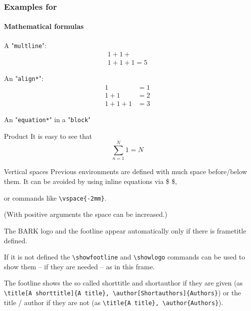 \documentclass{beamer}
\begin{document}
	\begin{frame}
		\frametitle{Examples for}
		\framesubtitle{Mathematical formulas}
		
		A "\texttt{multline}":
		\begin{multline}
		1 + 1+ \\ 1+ 1 + 1 = 5
		\end{multline}
		
		An "\texttt{align*}":
		\begin{align*}
		 1 &= 1 \\
		 1+1&=2 \\
		 1+1+1 &= 3
		\end{align*}
		
		An "\texttt{equation*}" in a "\texttt{block}"
		\begin{block}{Product}
			It is easy to see that
			\begin{equation*}
				\sum_{n=1}^N 1 = N
			\end{equation*}
		\end{block}
		
	\end{frame}
	
	\begin{frame}{Vertical spaces}
		Previous environments are defined with much space before/below them. It can be avoided by using inline equations via \$ \$,
		
		\vspace{3mm}
		
		or commands like \texttt{\textbackslash vspace\{-2mm\}}.
		
		\vspace{3mm}
		
		(With positive arguments the space can be increased.)
	\end{frame}
	
	\begin{frame}	\showfootline
    \showlogo
    
    
		
		The BARK logo and the footline appear automatically only if there is frametitle defined.
		
		\vspace{3mm}
		
		If it is not defined the \texttt{\textbackslash showfootline} and \texttt{\textbackslash showlogo} commands can be used to show them -- if they are needed -- as in this frame.
		
		\vspace{3mm}
		
		The footline shows the so called shorttitle and shortauthor if they are given (as \texttt{\textbackslash title[A shorttitle]\{A title\}, \textbackslash author[Shortauthors]\{Authors\}}) or the title / author if they are not (as \texttt{\textbackslash title\{A title\}, \textbackslash author\{Authors\}}).
		
	
		
		
	\end{frame}
\end{document}
